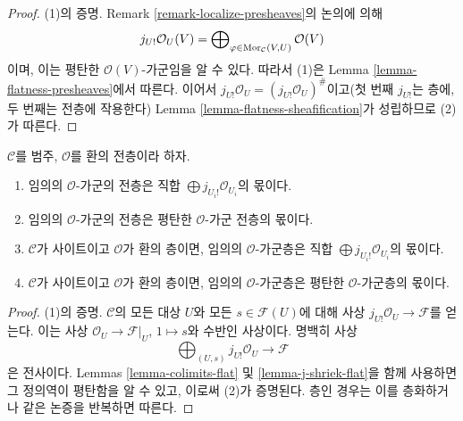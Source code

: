 \begin{proof}
(1)의 증명. Remark \ref{remark-localize-presheaves}의 논의에 의해
$$
j_{U!}\mathcal{O}_U(V)
=
\bigoplus\nolimits_{\varphi \in \mathop{\mathrm{Mor}}\nolimits_\mathcal{C}(V, U)}
\mathcal{O}(V)
$$
이며, 이는 평탄한 $\mathcal{O}(V)$-가군임을 알 수 있다. 따라서 (1)은
Lemma \ref{lemma-flatness-presheaves}에서 따른다. 이어서
$j_{U!}\mathcal{O}_U = (j_{U!}\mathcal{O}_U)^\#$이고(첫 번째
$j_{U!}$는 층에, 두 번째는 전층에 작용한다) Lemma
\ref{lemma-flatness-sheafification}가 성립하므로 (2)가 따른다.
\end{proof}

\begin{lemma}
\label{lemma-module-quotient-flat}
$\mathcal{C}$를 범주, $\mathcal{O}$를 환의 전층이라 하자.
\begin{enumerate}
\item 임의의 $\mathcal{O}$-가군의 전층은 직합
$\bigoplus j_{U_i!}\mathcal{O}_{U_i}$의 몫이다.
\item 임의의 $\mathcal{O}$-가군의 전층은 평탄한
$\mathcal{O}$-가군 전층의 몫이다.
\item $\mathcal{C}$가 사이트이고 $\mathcal{O}$가 환의 층이면, 임의의
$\mathcal{O}$-가군층은 직합 $\bigoplus j_{U_i!}\mathcal{O}_{U_i}$의 몫이다.
\item $\mathcal{C}$가 사이트이고 $\mathcal{O}$가 환의 층이면, 임의의
$\mathcal{O}$-가군층은 평탄한 $\mathcal{O}$-가군층의 몫이다.
\end{enumerate}
\end{lemma}

\begin{proof}
(1)의 증명. $\mathcal{C}$의 모든 대상 $U$와 모든
$s \in \mathcal{F}(U)$에 대해 사상
$j_{U!}\mathcal{O}_U \to \mathcal{F}$를 얻는다. 이는 사상
$\mathcal{O}_U \to \mathcal{F}|_U$, $1 \mapsto s$와 수반인 사상이다.
명백히 사상
$$
\bigoplus\nolimits_{(U, s)} j_{U!}\mathcal{O}_U
\longrightarrow
\mathcal{F}
$$
은 전사이다. Lemmas \ref{lemma-colimits-flat} 및
\ref{lemma-j-shriek-flat}을 함께 사용하면 그 정의역이 평탄함을 알 수 있고,
이로써 (2)가 증명된다. 층인 경우는 이를 층화하거나 같은 논증을 반복하면
따른다.
\end{proof}

